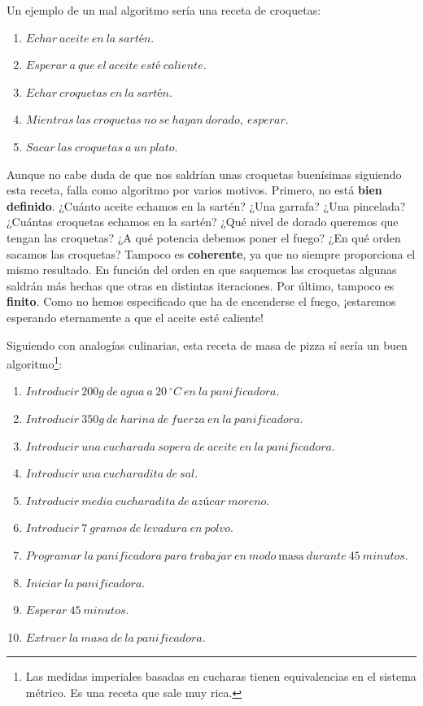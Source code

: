 Un ejemplo de un mal algoritmo sería una receta de croquetas:

\begin{enumerate}
	\item $Echar\ aceite\ en\ la\ sartén$.
	\item $Esperar\ a\ que\ el\ aceite\ esté\ caliente$.
	\item $Echar\ croquetas\ en\ la\ sartén$.
	\item $Mientras\ las\ croquetas\ no\ se\ hayan\ dorado,\ esperar$.
	\item $Sacar\ las\ croquetas\ a\ un\ plato$.
\end{enumerate}

Aunque no cabe duda de que nos saldrían unas croquetas buenísimas siguiendo esta receta, falla como algoritmo por varios motivos.
Primero, no está \textbf{bien definido}.
¿Cuánto aceite echamos en la sartén?
¿Una garrafa?
¿Una pincelada?
¿Cuántas croquetas echamos en la sartén?
¿Qué nivel de dorado queremos que tengan las croquetas?
¿A qué potencia debemos poner el fuego?
¿En qué orden sacamos las croquetas?
Tampoco es \textbf{coherente}, ya que no siempre proporciona el mismo resultado.
En función del orden en que saquemos las croquetas algunas saldrán más hechas que otras en distintas iteraciones.
Por último, tampoco es \textbf{finito}.
Como no hemos especificado que ha de encenderse el fuego, ¡estaremos esperando eternamente a que el aceite esté caliente!

Siguiendo con analogías culinarias, esta receta de masa de pizza sí sería un buen algoritmo\footnote{Las medidas imperiales basadas en cucharas tienen equivalencias en el sistema métrico. Es una receta que sale muy rica.}:

\begin{enumerate}
	\item $Introducir\ 200g\ de\ agua\ a\ 20\ ^{\circ}C\ en\ la\ panificadora$.
	\item $Introducir\ 350g\ de\ harina\ de\ fuerza\ en\ la\ panificadora$.
	\item $Introducir\ una\ cucharada\ sopera\ de\ aceite\ en\ la\ panificadora$.
	\item $Introducir\ una\ cucharadita\ de\ sal$.
	\item $Introducir\ media\ cucharadita\ de\ azúcar\ moreno$.
	\item $Introducir\ 7\ gramos\ de\ levadura\ en\ polvo$.
	\item $Programar\ la\ panificadora\ para\ trabajar\ en\ modo\ \text{masa}\ durante\ 45\ minutos$.
	\item $Iniciar\ la\ panificadora$.
	\item $Esperar\ 45\ minutos$.
	\item $Extraer\ la\ masa\ de\ la\ panificadora$.
\end{enumerate}

